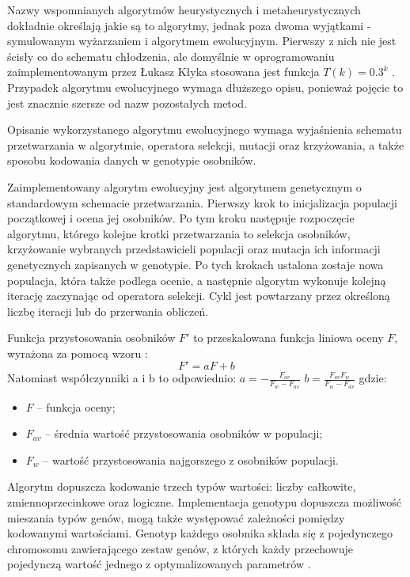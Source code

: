 \documentclass[11pt,a4paper]{llncs}
\begin{document}
Nazwy wspomnianych algorytmów heurystycznych i metaheurystycznych dokładnie określają jakie są to algorytmy, jednak poza dwoma wyjątkami - symulowanym wyżarzaniem i algorytmem ewolucyjnym.
Pierwszy z nich nie jest ścisły co do schematu chłodzenia, ale domyślnie w oprogramowaniu zaimplementowanym przez Łukasz Kłyka stosowana jest funkcja \( T(k) = 0.3^{k} \) \cite[str. 36]{klyk}.
Przypadek algorytmu ewolucyjnego wymaga dłuższego opisu, ponieważ pojęcie to jest znacznie szersze od nazw pozostałych metod.



Opisanie wykorzystanego algorytmu ewolucyjnego wymaga wyjaśnienia schematu przetwarzania w algorytmie, operatora selekcji, mutacji oraz krzyżowania, a także sposobu kodowania danych w genotypie osobników.



Zaimplementowany algorytm ewolucyjny jest algorytmem genetycznym o standardowym schemacie przetwarzania.
Pierwszy krok to inicjalizacja populacji początkowej i ocena jej osobników.
Po tym kroku następuje rozpoczęcie algorytmu, którego kolejne krotki przetwarzania to selekcja osobników, krzyżowanie wybranych przedstawicieli populacji oraz mutacja ich informacji genetycznych zapisanych w genotypie.
Po tych krokach ustalona zostaje nowa populacja, która także podlega ocenie, a następnie algorytm wykonuje kolejną iterację zaczynając od operatora selekcji.
Cykl jest powtarzany przez określoną liczbę iteracji lub do przerwania obliczeń.



Funkcja przystosowania osobników \( F' \) to przeskalowana funkcja liniowa oceny \( F \), wyrażona za pomocą wzoru \cite[str. 28]{klyk}:
$$ F' = aF + b $$
Natomiast współczynniki a i b to odpowiednio:
\( a = - \frac{F_{av}}{F_{w} - F_{av}} \)
\( b = \frac{F_{av}F_{w}}{F_{w} - F_{av}} \)
gdzie:
\begin{itemize}
	\item \( F \) -- funkcja oceny;
	\item \( F_{av} \) -- średnia wartość przystosowania osobników w populacji;
	\item \( F_{w} \) -- wartość przystosowania najgorszego z osobników populacji.
\end{itemize}



Algorytm dopuszcza kodowanie trzech typów wartości: liczby całkowite, zmiennoprzecinkowe oraz logiczne.
Implementacja genotypu dopuszcza możliwość mieszania typów genów, mogą także występować zależności pomiędzy kodowanymi wartościami.
Genotyp każdego osobnika składa się z pojedynczego chromosomu zawierającego zestaw genów, z których każdy przechowuje pojedynczą wartość jednego z optymalizowanych parametrów \cite[str. 30]{klyk}.
\end{document}
